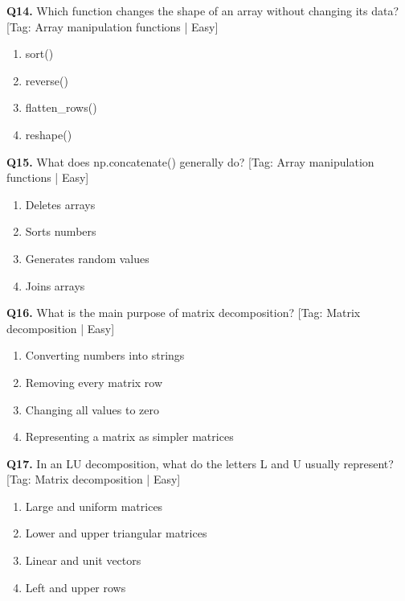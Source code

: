\vspace{2mm}
\noindent\textbf{Q14.} Which function changes the shape of an array without changing its data? \hfill [Tag: Array manipulation functions | Easy]
\begin{enumerate}[label=(\alph*),topsep=2pt,itemsep=1pt,partopsep=0pt,parsep=0pt]
    \item {sort()}
    \item {reverse()}
    \item {flatten\_rows()}
    \item {reshape()}
\end{enumerate}
\vspace{2mm}
\noindent\textbf{Q15.} What does np.concatenate() generally do? \hfill [Tag: Array manipulation functions | Easy]
\begin{enumerate}[label=(\alph*),topsep=2pt,itemsep=1pt,partopsep=0pt,parsep=0pt]
    \item {Deletes arrays}
    \item {Sorts numbers}
    \item {Generates random values}
    \item {Joins arrays}
\end{enumerate}
\vspace{2mm}
\noindent\textbf{Q16.} What is the main purpose of matrix decomposition? \hfill [Tag: Matrix decomposition | Easy]
\begin{enumerate}[label=(\alph*),topsep=2pt,itemsep=1pt,partopsep=0pt,parsep=0pt]
    \item {Converting numbers into strings}
    \item {Removing every matrix row}
    \item {Changing all values to zero}
    \item {Representing a matrix as simpler matrices}
\end{enumerate}
\vspace{2mm}
\noindent\textbf{Q17.} In an LU decomposition, what do the letters L and U usually represent? \hfill [Tag: Matrix decomposition | Easy]
\begin{enumerate}[label=(\alph*),topsep=2pt,itemsep=1pt,partopsep=0pt,parsep=0pt]
    \item {Large and uniform matrices}
    \item {Lower and upper triangular matrices}
    \item {Linear and unit vectors}
    \item {Left and upper rows}
\end{enumerate}
